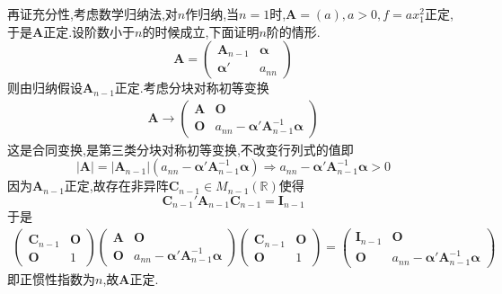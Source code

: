 \begin{formal}
\begin{Proof}
        再证充分性,考虑数学归纳法,对$n$作归纳,当$n=1$时,$\bm{A}=\left(a\right),a>0,f=ax_1^2$正定,于是$\bm{A}$正定.设阶数小于$n$的时候成立,下面证明$n$阶的情形.\[
        \bm{A}=\begin{pmatrix}
            \bm{A}_{n-1}&\bm{\alpha}\\
            \bm{\alpha}'&a_{nn}
        \end{pmatrix}
        \]则由归纳假设$\bm{A}_{n-1}$正定.考虑分块对称初等变换\begin{align*}
            \bm{A}\longrightarrow\begin{pmatrix}
                \bm{A}&\bm{O}\\
                \bm{O}&a_{nn}-\bm{\alpha}'\bm{A}_{n-1}^{-1}\bm{\alpha}
            \end{pmatrix}
        \end{align*}这是合同变换,是第三类分块对称初等变换,不改变行列式的值即\[
        \left|\bm{A}\right|=\left|\bm{A}_{n-1}\right|\left(
            a_{nn}-\bm{\alpha}'\bm{A}_{n-1}^{-1}\bm{\alpha}
        \right)\Longrightarrow a_{nn}-\bm{\alpha}'\bm{A}_{n-1}^{-1}\bm{\alpha}>0
        \]因为$\bm{A}_{n-1}$正定,故存在非异阵$\bm{C}_{n-1}\in M_{n-1}\left(\mathbb{R}\right)$使得\[
        \bm{C}_{n-1}'\bm{A}_{n-1}\bm{C}_{n-1}=\bm{I}_{n-1}
        \]于是\begin{align*}
            \begin{pmatrix}
                \bm{C}_{n-1}&\bm{O}\\
                \bm{O}&1
            \end{pmatrix}
            \begin{pmatrix}
                \bm{A}&\bm{O}\\
                \bm{O}&a_{nn}-\bm{\alpha}'\bm{A}_{n-1}^{-1}\bm{\alpha}
            \end{pmatrix}
            \begin{pmatrix}
                \bm{C}_{n-1}&\bm{O}\\
                \bm{O}&1
            \end{pmatrix}=\begin{pmatrix}
                \bm{I}_{n-1}&\bm{O}\\
                \bm{O}&a_{nn}-\bm{\alpha}'\bm{A}_{n-1}^{-1}\bm{\alpha}
            \end{pmatrix}
        \end{align*}即正惯性指数为$n$,故$\bm{A}$正定.
    \end{Proof}
\end{formal}
